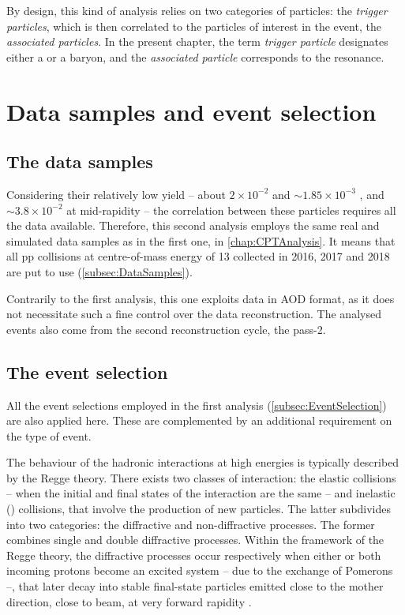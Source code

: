 By design, this kind of analysis relies on two categories of particles: the \textit{trigger particles}, which is then correlated to the particles of interest in the event, the \textit{associated particles}. In the present chapter, the term \textit{trigger particle} designates either a \rmXi or a \rmOmega baryon, and the \textit{associated particle} corresponds to the \rmPhiMes resonance.

\newpage

\section{Data samples and event selection}
\label{sec:DataSamplesCorrelation}

\subsection{The data samples}

Considering their relatively low yield -- about $ 2 \times 10^{-2}$ \rmXi and $\sim 1.85 \times 10^{-3}$ \rmOmega, and $\sim 3.8 \times 10^{-2}$ \rmPhiMes at mid-rapidity \cite{alicecollaborationProductionLightflavorHadrons2021} -- the correlation between these particles requires all the data available. Therefore, this second analysis employs the same real and simulated data samples as in the first one, in \chap\ref{chap:CPTAnalysis}. It means that all pp collisions at centre-of-mass energy of 13 \tev collected in 2016, 2017 and 2018 are put to use (\Sec\ref{subsec:DataSamples}). 

Contrarily to the first analysis, this one exploits data in AOD format, as it does not necessitate such a fine control over the data reconstruction. The analysed events also come from the second reconstruction cycle, the pass-2.

\subsection{The event selection}

All the event selections employed in the first analysis (\Sec\ref{subsec:EventSelection}) are also applied here. These are complemented by an additional requirement on the type of event.

The behaviour of the hadronic interactions at high energies is typically described by the Regge theory\cite{collinsIntroductionReggeTheory1977}. There exists two classes of interaction: the elastic collisions -- when the initial and final states of the interaction are the same -- and inelastic (\INEL) collisions, that involve the production of new particles. The latter subdivides into two categories: the diffractive and non-diffractive processes. The former combines single and double diffractive processes. Within the framework of the Regge theory, the diffractive processes occur respectively when either or both incoming protons become an excited system -- due to the exchange of Pomerons --, that later decay into stable final-state particles emitted close to the mother direction, \ie close to beam, at very forward rapidity \cite{alicecollaborationMeasurementInelasticSingle2013}.

